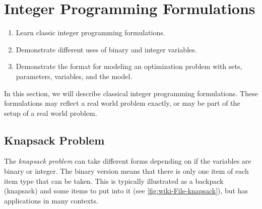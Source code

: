 
% 

\chapter{Integer Programming Formulations}

\label{sec:IP-formulations} 
\begin{outcome}
\begin{enumerate}
\item[A.] Learn classic integer programming formulations.
\item[B.] Demonstrate different uses of binary and integer variables.
\item[C.]  Demonstrate the format for modeling an optimization problem with sets, parameters, variables, and the model.
\end{enumerate}
\end{outcome}

In this section, we will describe classical integer programming formulations.     These formulations may reflect  a real world problem exactly, or may be part of the setup of a real world problem.   

\section{Knapsack Problem}
The \emph{knapsack problem} can take different forms depending on if the variables are binary or integer.  The binary version means that there is only one item of each item type that can be taken.  This is typically illustrated as a backpack (knapsack) and some items to put into it (see  \autoref{fig:wiki-File-knapsack}), but has applications in many contexts.  


